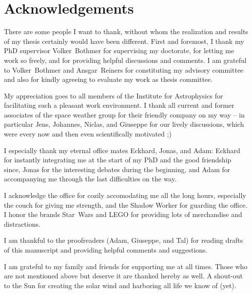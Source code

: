 
\chapter*{Acknowledgements}

There are some people I want to thank, without whom the realization and results of my thesis certainly would have been different.
First and foremost, I thank my PhD supervisor Volker~Bothmer for supervising my doctorate, for letting me work so freely, and for providing helpful discussions and comments.
I am grateful to Volker~Bothmer and Ansgar~Reiners for constituting my advisory committee and also for kindly agreeing to evaluate my work as thesis committee.

My appreciation goes to all members of the Institute for Astrophysics for facilitating such a pleasant work environment.
I thank all current and former associates of the space weather group for their friendly company on my way -- in particular Jens, Johannes, Niclas, and Giuseppe for our lively discussions, which were every now and then even scientifically motivated ;)

I especially thank my eternal office mates Eckhard, Jonas, and Adam:
Eckhard for instantly integrating me at the start of my PhD and the good friendship since,
Jonas for the interesting debates during the beginning,
and Adam for accompanying me through the last difficulties on the way.

I acknowledge the office for cozily accomodating me all the long hours, especially the couch for giving me strength, and the Shadow Worker for guarding the office. I honor the brands Star~Wars and LEGO for providing lots of merchandise and distractions.

I am thankful to the proofreaders (Adam, Giuseppe, and Tal) for reading drafts of this manuscript and providing helpful comments and suggestions.

I am grateful to my family and friends for supporting me at all times.
Those who are not mentioned above but deserve it are thanked hereby as well.
A shout-out to the Sun for creating the solar wind and harboring all life we know of (yet).




